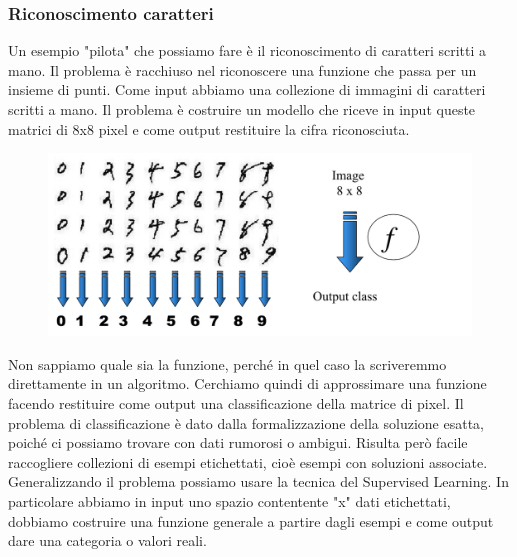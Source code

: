\documentclass{article}
\begin{document}
\subsubsection{Riconoscimento caratteri}
Un esempio "pilota" che possiamo fare è il riconoscimento di caratteri scritti a mano. Il problema è racchiuso nel riconoscere una funzione che passa per un insieme di punti. Come input abbiamo una collezione di immagini di caratteri scritti a mano. Il problema è costruire un modello che riceve in input queste matrici di 8x8 pixel e come output restituire la cifra riconosciuta.
\begin{figure}[H]
    \centering
    \includegraphics[scale=0.5]{Images/caratteririconoscimento.png}
\end{figure}
Non sappiamo quale sia la funzione, perché in quel caso la scriveremmo direttamente in un algoritmo. Cerchiamo quindi di approssimare una funzione facendo restituire come output una classificazione della matrice di pixel. Il problema di classificazione è dato dalla formalizzazione della soluzione esatta, poiché ci possiamo trovare con dati rumorosi o ambigui. Risulta però facile raccogliere collezioni di esempi etichettati, cioè esempi con soluzioni associate. \newline
Generalizzando il problema possiamo usare la tecnica del Supervised Learning. In particolare abbiamo in input uno spazio contentente "x" dati etichettati, dobbiamo costruire una funzione generale a partire dagli esempi e come output dare una categoria o valori reali. 
\end{document}

